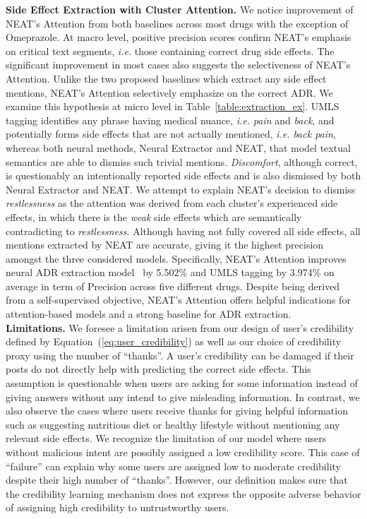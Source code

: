 \documentclass{bmcart}
\begin{document}
{\bf Side Effect Extraction with Cluster Attention.} We notice improvement of NEAT's Attention from both baselines across most drugs with the exception of Omeprazole. At macro level, positive precision scores confirm NEAT's emphasis on critical text segments, \textit{i.e.} those containing correct drug side effects. The significant improvement in most cases also suggests the selectiveness of NEAT's Attention. Unlike the two proposed baselines which extract any side effect mentions, NEAT's Attention selectively emphasize on the correct ADR. We examine this hypothesis at micro level in Table~\ref{table:extraction_ex}. UMLS tagging identifies any phrase having medical nuance, \textit{i.e.} \textit{pain} and \textit{back}, and potentially forms side effects that are not actually mentioned, \textit{i.e.} \textit{back pain}, whereas both neural methods, Neural Extractor and NEAT, that model textual semantics are able to dismiss such trivial mentions. \textit{Discomfort}, although correct, is questionably an intentionally reported side effects and is also dismissed by both Neural Extractor and NEAT. We attempt to explain NEAT's decision to dismiss \textit{restlessness} as the attention was derived from each cluster's experienced side effects, in which there is the \textit{weak} side effects which are semantically contradicting to \textit{restlessness}. Although having not fully covered all side effects, all mentions extracted by NEAT are accurate, giving it the highest precision amongst the three considered models. Specifically, NEAT's Attention improves neural ADR extraction model~\cite{ding2018attentive} by 5.502\% and UMLS tagging by 3.974\% on average in term of Precision across five different drugs. Despite being derived from a self-supervised objective, NEAT's Attention offers helpful indications for attention-based models and a strong baseline for ADR extraction. \\

{\bf Limitations.} We foresee a limitation arisen from our design of user's credibility defined by Equation~(\ref{eq:user_credibility}) as well as our choice of credibility proxy using the number of ``thanks''. A user's credibility can be damaged if their posts do not directly help with predicting the correct side effects. 
This assumption is questionable when users are asking for some information instead of giving answers without any intend to give misleading information. 
In contrast, we also observe the cases where users receive thanks for giving helpful information such as suggesting nutritious diet or healthy lifestyle without mentioning any relevant side effects. We recognize the limitation of our model where users without malicious intent are possibly assigned a low credibility score. This case of ``failure'' can explain why some users are assigned low to moderate credibility despite their high number of ``thanks''. However, our definition makes sure that the credibility learning mechanism does not express the opposite adverse behavior of assigning high credibility to untrustworthy users.
\end{document}
